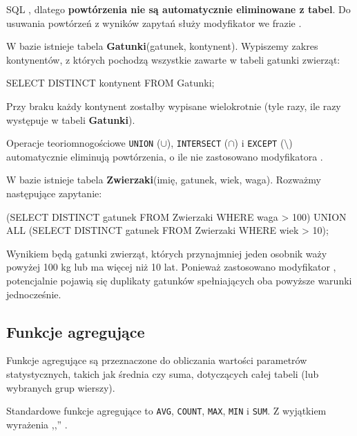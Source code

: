 SQL , dlatego \textbf{powtórzenia nie są automatycznie eliminowane z tabel}. Do usuwania powtórzeń z wyników zapytań służy modyfikator  we frazie .

\begin{example}
    W bazie istnieje tabela \textbf{Gatunki}(gatunek, kontynent). Wypiszemy zakres kontynentów, z których pochodzą wszystkie zawarte w tabeli gatunki zwierząt:
    \begin{sql} 
        SELECT DISTINCT kontynent
        FROM Gatunki;
    \end{sql}

    Przy braku  każdy kontynent zostałby wypisane wielokrotnie (tyle razy, ile razy występuje w tabeli \textbf{Gatunki}).
\end{example}

Operacje teoriomnogościowe \texttt{UNION} ($\cup$), \texttt{INTERSECT} ($\cap$) i \texttt{EXCEPT} ($\setminus$) automatycznie eliminują powtórzenia, o ile nie zastosowano modyfikatora .

\begin{example}
	W bazie istnieje tabela \textbf{Zwierzaki}(imię, gatunek, wiek, waga). Rozważmy następujące zapytanie:
	
    \begin{sql}
        (SELECT DISTINCT gatunek
        FROM Zwierzaki
        WHERE waga > 100)
        UNION ALL
        (SELECT DISTINCT gatunek
        FROM Zwierzaki
        WHERE wiek > 10);
    \end{sql}
    
    Wynikiem będą gatunki zwierząt, których przynajmniej jeden osobnik waży powyżej 100 kg lub ma więcej niż 10 lat. Ponieważ zastosowano modyfikator , potencjalnie pojawią się duplikaty gatunków spełniających oba powyższe warunki jednocześnie.
\end{example}

\subsection{Funkcje agregujące}

Funkcje agregujące są przeznaczone do obliczania wartości parametrów statystycznych, takich jak średnia czy suma, dotyczących całej tabeli (lub wybranych grup wierszy).

Standardowe funkcje agregujące to \texttt{AVG}, \texttt{COUNT}, \texttt{MAX}, \texttt{MIN} i \texttt{SUM}. Z wyjątkiem wyrażenia
,,'' .

